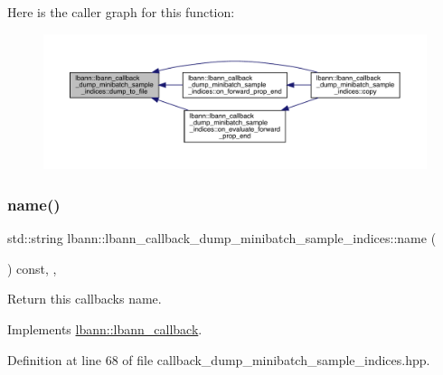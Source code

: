 Here is the caller graph for this function\+:\nopagebreak
\begin{figure}[H]
\begin{center}
\leavevmode
\includegraphics[width=350pt]{classlbann_1_1lbann__callback__dump__minibatch__sample__indices_a34d4564309168b3ab0b2e3092e2f9355_icgraph}
\end{center}
\end{figure}
\mbox{\label{classlbann_1_1lbann__callback__dump__minibatch__sample__indices_a8d2174d894176a7ab5324f5d7e6faad2}} 
\subsubsection{\texorpdfstring{name()}{name()}}
{\footnotesize\ttfamily std\+::string lbann\+::lbann\+\_\+callback\+\_\+dump\+\_\+minibatch\+\_\+sample\+\_\+indices\+::name (\begin{DoxyParamCaption}{ }\end{DoxyParamCaption}) const\hspace{0.3cm}{\ttfamily [inline]}, {\ttfamily [override]}, {\ttfamily [virtual]}}

Return this callback\textquotesingle{}s name. 

Implements \hyperlink{classlbann_1_1lbann__callback_a7522c7a14f1d6a1ea762cc2d7248eb3a}{lbann\+::lbann\+\_\+callback}.



Definition at line 68 of file callback\+\_\+dump\+\_\+minibatch\+\_\+sample\+\_\+indices.\+hpp.


